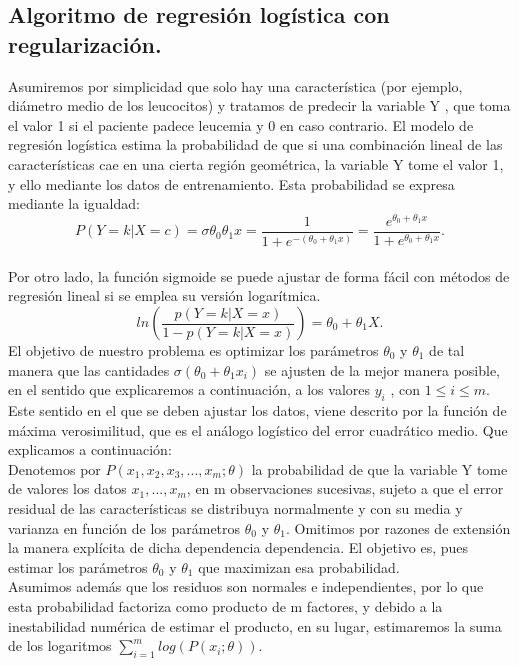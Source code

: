 \documentclass[a4paper,11pt]{article}
\begin{document}
\subsection{Algoritmo de regresión logística con regularización.}

Asumiremos por simplicidad que solo hay una característica (por ejemplo,
diámetro medio de los leucocitos) y tratamos de predecir la variable Y , que
toma el valor 1 si el paciente padece leucemia y 0 en caso contrario. El modelo
de regresión logística estima la probabilidad de que si una combinación lineal de
las características cae en una cierta región geométrica, la variable Y tome el
valor 1, y ello mediante los datos de entrenamiento. Esta probabilidad se expresa
mediante la igualdad:
\[
P(Y=k|X=c)=\sigma\theta_0\theta_1 x=\frac{1}{1+e^{-(\theta_0+\theta_1 x)}}=\frac{e^{\theta_0+\theta_1 x}}{1+e^{\theta_0+\theta_1 x}}.
\]
\\
Por otro lado, la función sigmoide se puede ajustar de forma fácil con
métodos de regresión lineal si se emplea su versión logarítmica.
\[
ln\left( \frac{p(Y=k|X=x)}{1-p(Y=k|X=x)}\right)=\theta_0 + \theta_1 X .
\]
El objetivo de nuestro problema es optimizar los parámetros $\theta_0$ y $\theta_1$ de tal
manera que las cantidades $\sigma (\theta_0 + \theta_1 x_{i})$ se ajusten de la mejor manera posible,
en el sentido que explicaremos a continuación, a los valores $y_i$
, con $1 \leq i \leq m$.
Este sentido en el que se deben ajustar los datos, viene descrito por la función de
máxima verosimilitud, que es el análogo logístico del error cuadrático medio. Que explicamos a continuación:\\

\noindent
Denotemos por $P(x_1, x_2, x_3, ..., x_m; \theta)$ la probabilidad de que la variable Y tome
de valores los datos $x_1, ..., x_m$, en m observaciones sucesivas, sujeto a que el error
residual de las características se distribuya normalmente y con su media y varianza en función de los parámetros $\theta_0$ y $\theta_1$. Omitimos por razones de extensión la
manera explícita de dicha dependencia dependencia. El objetivo es, pues estimar
los parámetros $\theta_0$ y $\theta_1$ que maximizan esa probabilidad.\\

\noindent
Asumimos además que los residuos son normales e independientes, por lo que esta probabilidad factoriza como producto de m factores, y debido a la inestabilidad
numérica de estimar el producto, en su lugar, estimaremos la suma de los logaritmos $\sum_{i=1}^m log(P(x_i ;\theta))$.\\
\end{document}
